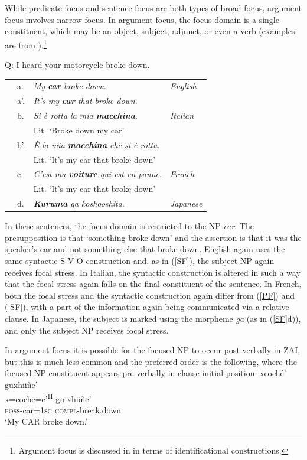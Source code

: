 While predicate focus and sentence focus are both types of broad focus, argument focus involves narrow focus. In argument focus, the focus domain is a single constituent, which may be an object, subject, adjunct, or even a verb (examples are from \citealt{lambrecht1994}).\footnote{Argument focus is discussed in  in terms of identificational constructions.}


\ea\label{AF}
{Q: I heard your motorcycle broke down.} \\
\begin{table} 
\begin{tabular}{l l l l}
 & a. & \textit{My \textbf{car} broke down}. & \textit{English} \\
 & a'. & \textit{It's my \textbf{car} that broke down}. \\
 & b. & \textit{Si \`{e} rotta la mia \textbf{macchina}}. & \textit{Italian} \\
  & & Lit. `Broke down my car' \\
   & b'. & \textit{\`{E} la mia \textbf{macchina} che si \`{e} rotta}. \\
     & & Lit. `It's my car that broke down' \\
 & c. & \textit{C'est ma \textbf{voiture} qui est en panne}. & \textit{French} \\
  & & Lit. `It's my car that broke down'  \\
   & d. & \textit{\textbf{Kuruma} ga koshooshita}.  & \textit{Japanese} \\
\end{tabular}
\end{table}
\z

In these sentences, the focus domain is restricted to the NP \textit{car}. The presupposition is that `something broke down' and the assertion is that it was the speaker's car and not something else that broke down. English again uses the same syntactic S-V-O construction and, as in (\ref{SF}), the subject NP again receives focal stress. In Italian, the syntactic construction is altered in such a way that the focal stress again falls on the final constituent of the sentence. In French, both the focal stress and the syntactic construction again differ from (\ref{PF}) and (\ref{SF}), with a part of the information again being communicated via a relative clause. In Japanese, the subject is marked using the morpheme \textit{ga} (as in (\ref{SF}d)), and only the subject NP receives focal stress.

In argument focus it is possible for the focused NP to occur post-verbally in ZAI, but this is much less common and the preferred order is the following, where the focused NP constituent appears pre-verbally in clause-initial position: 
\ea 
\glll xcoch\'{e}' guxhii\~{n}e' \\
x=coche=e'\textsuperscript{H} gu-xhii\~{n}e'  \\
\textsc{poss}-car=\textsc{1sg} \textsc{compl}-break.down  \\
\glt `My CAR broke down.'
\z

